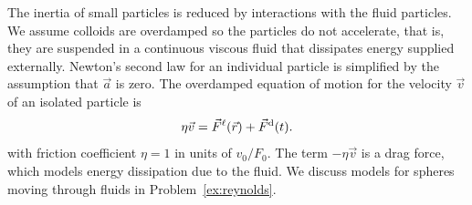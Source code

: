 \documentclass[preprint,showpacs,preprintnumbers,amsmath,amssymb,aps,prb]{revtex4-1}
\theoremstyle{remark}
\begin{document}
The inertia of 
small particles is reduced by interactions
with the fluid particles.\cite{Purcell1977}
We assume 
colloids are
overdamped
so the particles do not accelerate,
that is, they are suspended in a continuous viscous fluid
that dissipates energy supplied externally. 
Newton's second law for an individual particle
is simplified
by the assumption that $\vec{a}$ is zero. 
The overdamped equation of motion for
the velocity $\vec{v}$ of 
an isolated particle is
\begin{equation}
  \eta \vec{v} = \vec{F}^{\ell}(\vec{r}) + \vec{F}^{\rm d}(t).
    \label{eq:motion}
\end{equation}
with friction coefficient $\eta = 1$ in units of $v_0 / F_0$.
The term $-\eta \vec{v}$
is a drag force, which models
energy dissipation due to the fluid. 
We discuss  models for
spheres moving through fluids in 
Problem~\ref{ex:reynolds}. 
\end{document}
